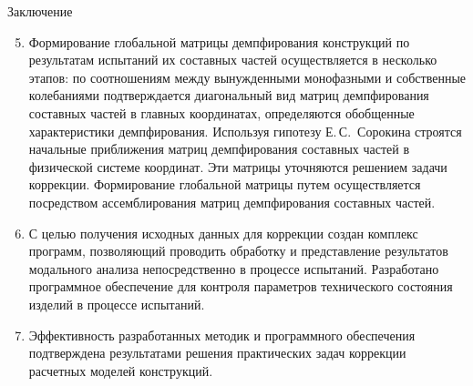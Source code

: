 \begin{frame}{Заключение}
	\begin{enumerate}
		\setcounter{enumi}{4}
		\small
		\item Формирование глобальной матрицы демпфирования конструкций по результатам испытаний их составных частей осуществляется в несколько этапов: по соотношениям между вынужденными монофазными и собственные колебаниями подтверждается диагональный вид матриц демпфирования составных частей в главных координатах, определяются обобщенные характеристики демпфирования. Используя гипотезу Е.\,С.~Сорокина строятся начальные приближения матриц демпфирования составных частей в физической системе координат. Эти матрицы уточняются решением задачи коррекции. Формирование глобальной матрицы путем осуществляется посредством ассемблирования матриц демпфирования составных частей. 
		\item С целью получения исходных данных для коррекции создан комплекс программ, позволяющий проводить обработку и представление результатов модального анализа непосредственно в процессе испытаний. Разработано программное обеспечение для контроля параметров технического состояния изделий в процессе испытаний.
		\item Эффективность разработанных методик и программного обеспечения подтверждена результатами решения практических задач коррекции расчетных моделей конструкций.
	\end{enumerate}
\end{frame}